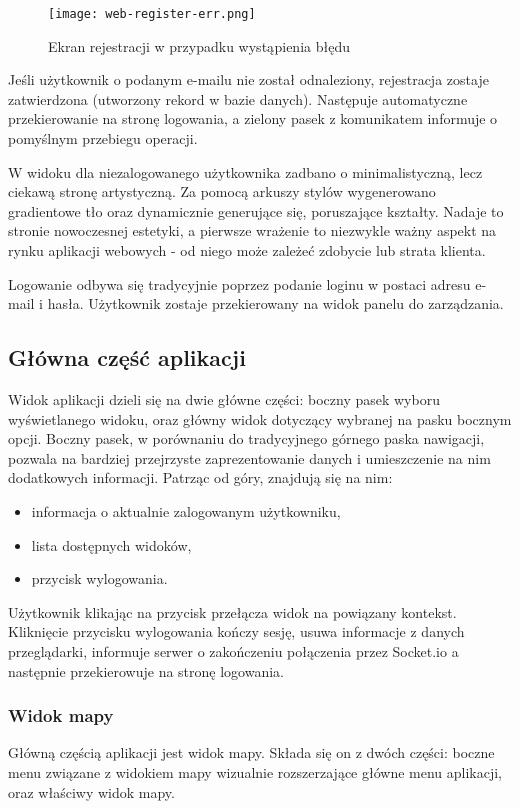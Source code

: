 \documentclass[eng,printmode]{mgr}
\begin{document}
\begin{figure}
\centering
\texttt{[image: web-register-err.png]}
\caption{Ekran rejestracji w przypadku wystąpienia błędu}
\end{figure}

Jeśli użytkownik o podanym e-mailu nie został odnaleziony, rejestracja zostaje zatwierdzona (utworzony rekord w bazie danych). Następuje automatyczne przekierowanie na stronę logowania, a zielony pasek z komunikatem informuje o pomyślnym przebiegu operacji.

W widoku dla niezalogowanego użytkownika zadbano o minimalistyczną, lecz ciekawą stronę artystyczną. Za pomocą arkuszy stylów wygenerowano gradientowe tło oraz dynamicznie generujące się, poruszające kształty. Nadaje to stronie nowoczesnej estetyki, a pierwsze wrażenie to niezwykle ważny aspekt na rynku aplikacji webowych - od niego może zależeć zdobycie lub strata klienta.

Logowanie odbywa się tradycyjnie poprzez podanie loginu w postaci adresu e-mail i hasła. Użytkownik zostaje przekierowany na widok panelu do zarządzania. 

\subsection{Główna część aplikacji}
Widok aplikacji dzieli się na dwie główne części: boczny pasek wyboru wyświetlanego widoku, oraz główny widok dotyczący wybranej na pasku bocznym opcji. Boczny pasek, w porównaniu do tradycyjnego górnego paska nawigacji, pozwala na bardziej przejrzyste zaprezentowanie danych i umieszczenie na nim dodatkowych informacji. Patrząc od góry, znajdują się na nim:
\begin{itemize}
\item informacja o aktualnie zalogowanym użytkowniku,
\item lista dostępnych widoków,
\item przycisk wylogowania.
\end{itemize}
Użytkownik klikając na przycisk przełącza widok na powiązany kontekst. Kliknięcie przycisku wylogowania kończy sesję, usuwa informacje z danych przeglądarki, informuje serwer o zakończeniu połączenia przez Socket.io a następnie przekierowuje na stronę logowania.


\subsubsection{Widok mapy}
Główną częścią aplikacji jest widok mapy. Składa się on z dwóch części: boczne menu związane z widokiem mapy wizualnie rozszerzające główne menu aplikacji, oraz właściwy widok mapy.
\end{document}
